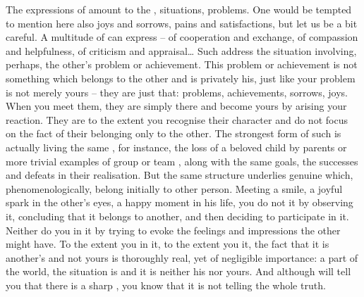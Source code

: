 \pa\act
The  expressions of  amount to  the
, situations, problems. One would be tempted to mention here
also joys and sorrows, pains and satisfactions, but let us be a bit careful. A
multitude of  can express  --  of cooperation and
exchange, of compassion and helpfulness, of criticism and appraisal\ldots
Such  address the  situation involving, perhaps, the other's
problem or achievement. This problem or achievement is not something which
belongs to the other and is privately his, just like {your} problem is not
merely {yours} -- they are just that: problems, achievements, sorrows, joys.
When {you} meet them, they are simply there and become {yours} by arising {your}
reaction.  They are  to the extent {you} recognise their
 character and do not focus on the fact of their belonging only to
the other.  The strongest form of such  is actually living the same
, for instance, the loss of a beloved child by parents or more
trivial examples of group or team , along with the same goals, the
successes and defeats in their realisation.  But the same structure underlies
genuine  which, phenomenologically, belong initially to
other person.  Meeting a smile, a joyful spark in the other's eyes, a happy
moment in his life, {you} do not  it by observing it, concluding that
it belongs to another, and then deciding to participate in it. Neither do you
 in it by trying to evoke the feelings and impressions the other
might have. To the extent {you}  in it, to the extent {you}
 it, the fact that it is another's and not {yours} is thoroughly real,
yet of negligible
importance: a part of the world, the  situation is  and it
is neither his nor yours.  And although  will tell you that there
is a sharp , you know that it is not telling the whole truth.

